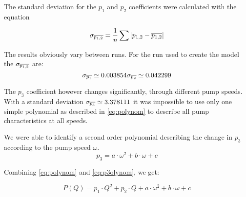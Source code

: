 The standard deviation for the $p_1$ and $p_2$ coefficients were calculated with the equation 

\begin{equation}
	\sigma_{\overline{p_{1,2}}} = \dfrac{1}{n}\sum |p_{1,2}-\overline{p_{1,2}}|
	\label{eq:avedev}
\end{equation}

The results obviously vary between runs. For the run used to create the model the $\sigma_{\overline{p_{1,2}}}$ are:
\begin{equation}
	\sigma_{\mean{p_1}} \simeq 0.003854$$
	
	$$\sigma_{\mean{p_2}} \simeq 0.042299
\end{equation}

The $p_3$ coefficient however changes significantly, through different pump speeds.
With a standard deviation $\sigma_{\overline{p_3}} \simeq 3.378111$ it was impossible to use only one simple polynomial as described in 
\ref{eq:polynom} to describe all pump characteristics at all speeds.

We were able to identify a second order polynomial describing the change in $p_3$ according to the pump speed $\omega$.
\begin{equation}
	 p_3 = a \cdot \omega^2 + b \cdot \omega + c
	 \label{eq:p3olynom}
\end{equation}

Combining \ref{eq:polynom} and \ref{eq:p3olynom}, we get:

\begin{equation}
	P(Q) = p_1 \cdot Q^2 + p_2 \cdot Q + a \cdot \omega^2 + b \cdot \omega + c 
\end{equation}
